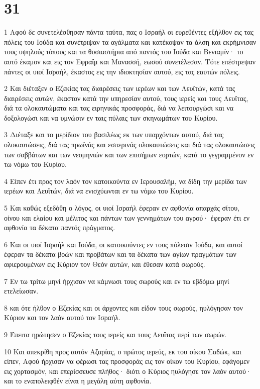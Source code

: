 \chapter{31}

\par 1 Αφού δε συνετελέσθησαν πάντα ταύτα, πας ο Ισραήλ οι ευρεθέντες εξήλθον εις τας πόλεις του Ιούδα και συνέτριψαν τα αγάλματα και κατέκοψαν τα άλση και εκρήμνισαν τους υψηλούς τόπους και τα θυσιαστήρια από παντός του Ιούδα και Βενιαμίν· το αυτό έκαμον και εις τον Εφραΐμ και Μανασσή, εωσού συνετέλεσαν. Τότε επέστρεψαν πάντες οι υιοί Ισραήλ, έκαστος εις την ιδιοκτησίαν αυτού, εις τας εαυτών πόλεις.
\par 2 Και διέταξεν ο Εζεκίας τας διαιρέσεις των ιερέων και των Λευϊτών, κατά τας διαιρέσεις αυτών, έκαστον κατά την υπηρεσίαν αυτού, τους ιερείς και τους Λευΐτας, διά τα ολοκαυτώματα και τας ειρηνικάς προσφοράς, διά να λειτουργώσι και να δοξολογώσι και να υμνώσιν εν ταις πύλαις των σκηνωμάτων του Κυρίου.
\par 3 Διέταξε και το μερίδιον του βασιλέως εκ των υπαρχόντων αυτού, διά τας ολοκαυτώσεις, διά τας πρωϊνάς και εσπερινάς ολοκαυτώσεις και διά τας ολοκαυτώσεις των σαββάτων και των νεομηνιών και των επισήμων εορτών, κατά το γεγραμμένον εν τω νόμω του Κυρίου.
\par 4 Είπεν έτι προς τον λαόν τον κατοικούντα εν Ιερουσαλήμ, να δίδη την μερίδα των ιερέων και Λευϊτών, διά να ενισχύωνται εν τω νόμω του Κυρίου.
\par 5 Και καθώς εξεδόθη ο λόγος, οι υιοί Ισραήλ έφεραν εν αφθονία απαρχάς σίτου, οίνου και ελαίου και μέλιτος και πάντων των γεννημάτων του αγρού· έφεραν έτι εν αφθονία τα δέκατα παντός πράγματος.
\par 6 Και οι υιοί Ισραήλ και Ιούδα, οι κατοικούντες εν τους πόλεσιν Ιούδα, και αυτοί έφεραν τα δέκατα βοών και προβάτων και τα δέκατα των αγίων πραγμάτων των αφιερουμένων εις Κύριον τον Θεόν αυτών, και έθεσαν κατά σωρούς.
\par 7 Εν τω τρίτω μηνί ήρχισαν να κάμνωσι τους σωρούς και εν τω εβδόμω μηνί ετελείωσαν.
\par 8 και ότε ήλθον ο Εζεκίας και οι άρχοντες και είδον τους σωρούς, ηυλόγησαν τον Κύριον και τον λαόν αυτού τον Ισραήλ.
\par 9 Έπειτα ηρώτησεν ο Εζεκίας τους ιερείς και τους Λευΐτας περί των σωρών.
\par 10 Και απεκρίθη προς αυτόν Αζαρίας, ο πρώτος ιερεύς, εκ του οίκου Σαδώκ, και είπεν, Αφού ήρχισαν να φέρωσι τας προσφοράς εις τον οίκον του Κυρίου, εφάγομεν εις χορτασμόν, και επερίσσευσε πλήθος· διότι ο Κύριος ηυλόγησε τον λαόν αυτού· και το εναπολειφθέν είναι η μεγάλη αύτη αφθονία.
